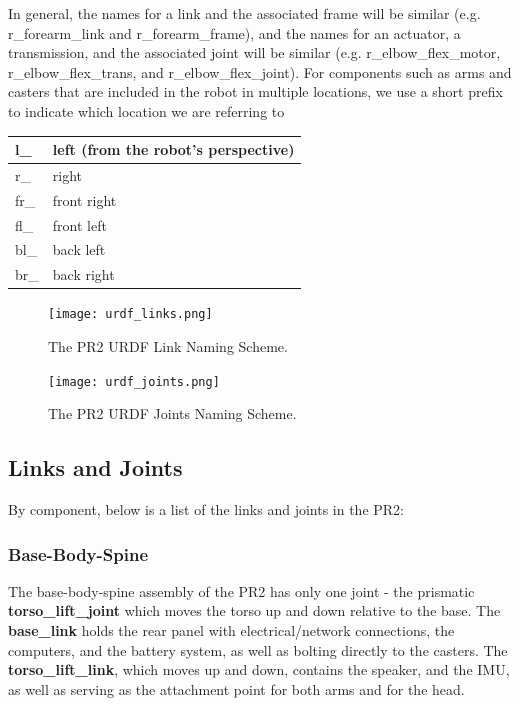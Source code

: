 In general, the names for a link and the associated frame will be similar
(e.g. r\_forearm\_link and r\_forearm\_frame), and the names for an actuator, a
transmission, and the associated joint will be similar
(e.g. r\_elbow\_flex\_motor, r\_elbow\_flex\_trans, and r\_elbow\_flex\_joint).
For components such as arms and casters that are included in the robot in
multiple locations, we use a short prefix to indicate which location we are
referring to

\begin{tabular}{| l | l |}
\hline
  l\_ & left (from the robot's perspective) \\ \hline
  r\_ & right \\ \hline
  fr\_ & front right \\ \hline
  fl\_ & front left \\ \hline
  bl\_ & back left \\ \hline
  br\_ & back right \\ \hline
\end{tabular}

\begin{figure}[!h]
\centering
\texttt{[image: urdf\_links.png]}
\caption{The PR2 URDF Link Naming Scheme.}
\label{fig:urdf_link_names}
\end{figure}
\begin{figure}[!h]
\centering
\texttt{[image: urdf\_joints.png]}
\caption{The PR2 URDF Joints Naming Scheme.}
\label{fig:urdf_joints}
\end{figure}

\subsection{Links and Joints}
By component, below is a list of the links and joints in the PR2:
\subsubsection{Base-Body-Spine}
The base-body-spine assembly of the PR2 has only one joint - the prismatic {\bf
  torso\_lift\_joint} which moves the torso up and down relative to the base.
The {\bf base\_link} holds the rear panel with electrical/network connections,
the computers, and the battery system, as well as bolting directly to the
casters.  The {\bf torso\_lift\_link}, which moves up and down, contains the
speaker, and the IMU, as well as serving as the attachment point for both arms
and for the head.
